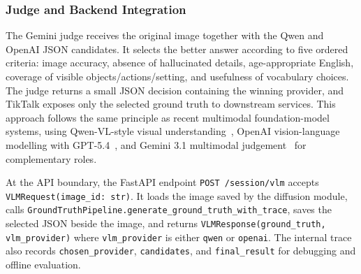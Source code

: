 \documentclass{article}
\begin{document}
\subsubsection{Judge and Backend Integration}
\label{sec:vlm-judge}

The Gemini judge receives the original image together with the Qwen and
OpenAI JSON candidates. It selects the better answer according to five
ordered criteria: image accuracy, absence of hallucinated details,
age-appropriate English, coverage of visible objects/actions/setting,
and usefulness of vocabulary choices. The judge returns a small JSON
decision containing the winning provider, and TikTalk exposes only the
selected ground truth to downstream services. This approach follows the
same principle as recent multimodal foundation-model systems, using
Qwen-VL-style visual understanding~\cite{bai2023qwenvl}, OpenAI
vision-language modelling with GPT-5.4~\cite{openai2026gpt54}, and
Gemini 3.1 multimodal judgement~\cite{google2025gemini31} for complementary
roles.

At the API boundary, the FastAPI endpoint \texttt{POST /session/vlm}
accepts \texttt{VLMRequest(image\_id: str)}. It loads the image saved by
the diffusion module, calls
\texttt{GroundTruthPipeline.generate\_ground\_truth\_with\_trace}, saves
the selected JSON beside the image, and returns
\texttt{VLMResponse(ground\_truth, vlm\_provider)} where
\texttt{vlm\_provider} is either \texttt{qwen} or \texttt{openai}. The
internal trace also records \texttt{chosen\_provider},
\texttt{candidates}, and \texttt{final\_result} for debugging and
offline evaluation.
\end{document}
